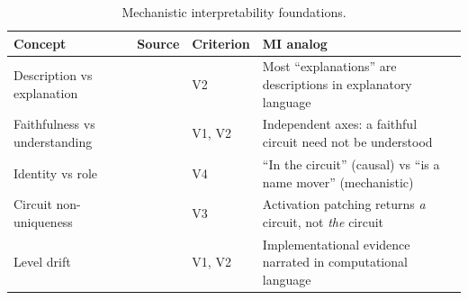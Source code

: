 \documentclass{article}
\begin{document}
\begin{table}[H]
\centering\small
\caption{Mechanistic interpretability foundations.}
\renewcommand{\arraystretch}{1.12}
\begin{tabular}{@{}l>{\raggedright\arraybackslash}p{2.2cm}l>{\raggedright\arraybackslash}p{4.5cm}@{}}
\toprule
\textbf{Concept} & \textbf{Source} & \textbf{Criterion} & \textbf{MI analog} \\
\midrule
Description vs explanation & \citet{olsson2022context} & V2 & Most ``explanations'' are descriptions in explanatory language \\
\midrule
Faithfulness vs understanding & \citet{wang2023interpretability} & V1, V2 & Independent axes: a faithful circuit need not be understood \\
\midrule
Identity vs role & \citet{wang2023interpretability} & V4 & ``In the circuit'' (causal) vs ``is a name mover'' (mechanistic) \\
\midrule
Circuit non-uniqueness & \citet{meloux2025everything} & V3 & Activation patching returns \emph{a} circuit, not \emph{the} circuit \\
\midrule
Level drift & \citet{marr1982vision} & V1, V2 & Implementational evidence narrated in computational language \\
\bottomrule
\end{tabular}
\end{table}
\end{document}
